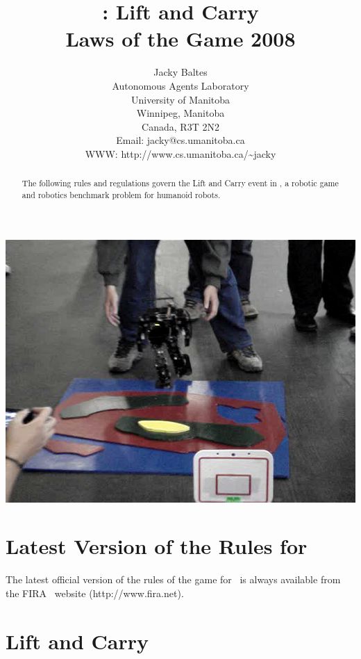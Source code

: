 \documentclass[12pt]{hurocup}
\begin{document}
\title{\HuroCup: Lift and Carry\\
  Laws of the Game 2008}

\author{Jacky Baltes\\
Autonomous Agents Laboratory\\
University of Manitoba\\
Winnipeg, Manitoba\\
Canada, R3T 2N2\\
Email: jacky@cs.umanitoba.ca\\
WWW: http://www.cs.umanitoba.ca/\~{ }jacky
}

\maketitle

\begin{center}
 \includegraphics[width=0.7\linewidth]{Figures/lift-and-carry-life}
\end{center}

\begin{abstract}
The following rules and regulations govern the Lift and Carry event in
\HuroCup, a robotic game and robotics benchmark problem for humanoid
robots.
%
\end{abstract}

\section*{Latest Version of the Rules for \HuroCup}
\label{sec:updates}

The latest official version of the rules of the game for \HuroCup\ is
always available from the FIRA \HuroCup\ website (http://www.fira.net).

\newpage

\section{Lift and Carry}
\label{sec:lift-and-carry} 
\end{document}
